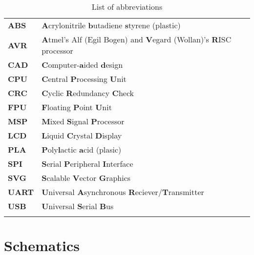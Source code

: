 \documentclass[a4paper, 11pt, twoside]{Thesis}  %
\begin{document}
{\begin{table}[!h]
\centering
\begin{tabulary}{\textwidth}{LL}
\hline\hline
 \textbf{ABS}   &  \textbf{A}crylonitrile \textbf{b}utadiene \textbf{s}tyrene (plastic)                     \\
 \textbf{AVR}   &  \textbf{A}tmel's Alf (Egil Bogen) and \textbf{V}egard (Wollan)'s \textbf{R}ISC processor \\
 \textbf{CAD}   &  \textbf{C}omputer-\textbf{a}ided \textbf{d}esign                                         \\
 \textbf{CPU}   &  \textbf{C}entral \textbf{P}rocessing \textbf{U}nit                                       \\
 \textbf{CRC}   &  \textbf{C}yclic \textbf{R}edundancy \textbf{C}heck                                       \\
 \textbf{FPU}   &  \textbf{F}loating \textbf{P}oint \textbf{U}nit                                           \\
 \textbf{MSP}   &  \textbf{M}ixed \textbf{S}ignal \textbf{P}rocessor                                        \\
 \textbf{LCD}   &  \textbf{L}iquid \textbf{C}rystal \textbf{D}isplay                                        \\
 \textbf{PLA}   &  \textbf{P}oly\textbf{l}actic \textbf{a}cid (plasic)                                      \\
 \textbf{SPI}   &  \textbf{S}erial \textbf{P}eripheral \textbf{I}nterface                                   \\
 \textbf{SVG}   &  \textbf{S}calable \textbf{V}ector \textbf{G}raphics                                      \\
 \textbf{UART}  &  \textbf{U}niversal \textbf{A}synchronous \textbf{R}eciever/\textbf{T}ransmitter                 \\
 \textbf{USB}   &  \textbf{U}niversal \textbf{S}erial \textbf{B}us                                          \\
\\
\end{tabulary}
\caption{	List of abbreviations}
\label{1}
\end{table}

\chapter{Schematics}
\label{AppendixC}

}
\end{document}
